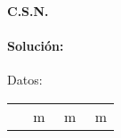 \documentclass[../main.tex]{subfiles}
\begin{document}
\paragraph{C.S.N.}
\paragraph{Solución:} 
Datos:\par
\begin{tabular}{llll}
$ $ & $ $ m &$ $ m & $ $ m
\end{tabular} \par
\end{document}
